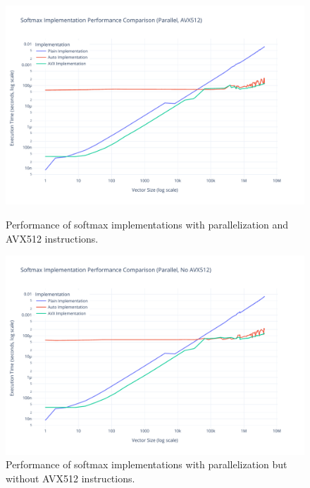 \documentclass[10pt]{report}
\begin{document}
\begin{figure}[H]
  \centering
  \begin{minipage}{0.49\textwidth}
    \centering
    \includegraphics[width=\textwidth]{../images/performance/softmax_parallel_avx512.pdf}
    \caption{Performance of softmax implementations with parallelization and AVX512 instructions.}
    \label{fig:perf_parallel_avx512}
  \end{minipage}
  \hfill
  \begin{minipage}{0.49\textwidth}
    \centering
    \includegraphics[width=\textwidth]{../images/performance/softmax_parallel_noavx512.pdf}
    \caption{Performance of softmax implementations with parallelization but without AVX512 instructions.}
    \label{fig:perf_parallel_noavx512}
  \end{minipage}
\end{figure}
\end{document}
